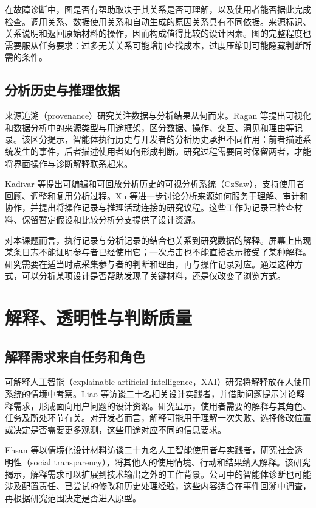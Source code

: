 在故障诊断中，图是否有帮助取决于其关系是否可理解，以及使用者能否据此完成检查。调用关系、数据使用关系和自动生成的原因关系具有不同依据。来源标识、关系说明和返回原始材料的操作，因而构成值得比较的设计因素。图的完整程度也需要服从任务要求：过多无关关系可能增加查找成本，过度压缩则可能隐藏判断所需的条件。

\subsection{分析历史与推理依据}

来源追溯（provenance）研究关注数据与分析结果从何而来。Ragan 等\cite{ref36}提出可视化和数据分析中的来源类型与用途框架，区分数据、操作、交互、洞见和理由等记录。该区分提示，智能体执行历史与开发者的分析历史承担不同作用：前者描述系统发生的事件，后者描述使用者如何形成判断。研究过程需要同时保留两者，才能将界面操作与诊断解释联系起来。

Kadivar 等\cite{ref38}提出可编辑和可回放分析历史的可视分析系统（CzSaw），支持使用者回顾、调整和复用分析过程。Xu 等\cite{ref37}进一步讨论分析来源如何服务于理解、审计和协作，并提出将操作记录与推理活动连接的研究议程。这些工作为记录已检查材料、保留暂定假设和比较分析分支提供了设计资源。

对本课题而言，执行记录与分析记录的结合也关系到研究数据的解释。屏幕上出现某条日志不能证明参与者已经使用它；一次点击也不能直接表示接受了某种解释。研究需要在适当时点采集参与者的判断和理由，再与操作记录对应。通过这种方式，可以分析某项设计是否帮助发现了关键材料，还是仅改变了浏览方式。

\section{解释、透明性与判断质量}

\subsection{解释需求来自任务和角色}

可解释人工智能（explainable artificial intelligence，XAI）研究将解释放在人使用系统的情境中考察。Liao 等\cite{ref49}访谈二十名相关设计实践者，并借助问题提示讨论解释需求，形成面向用户问题的设计资源。研究显示，使用者需要的解释与其角色、任务及所处环节有关。对开发者而言，解释可能用于理解一次失败、选择修改位置或决定是否需要更多观测，这些用途对应不同的信息要求。

Ehsan 等\cite{ref51}以情境化设计材料访谈二十九名人工智能使用者与实践者，研究社会透明性（social transparency），将其他人的使用情境、行动和结果纳入解释。该研究揭示，解释需求可以扩展到技术输出之外的工作背景。公司中的智能体诊断也可能涉及配置责任、已尝试的修改和历史处理经验，这些内容适合在事件回溯中调查，再根据研究范围决定是否进入原型。

